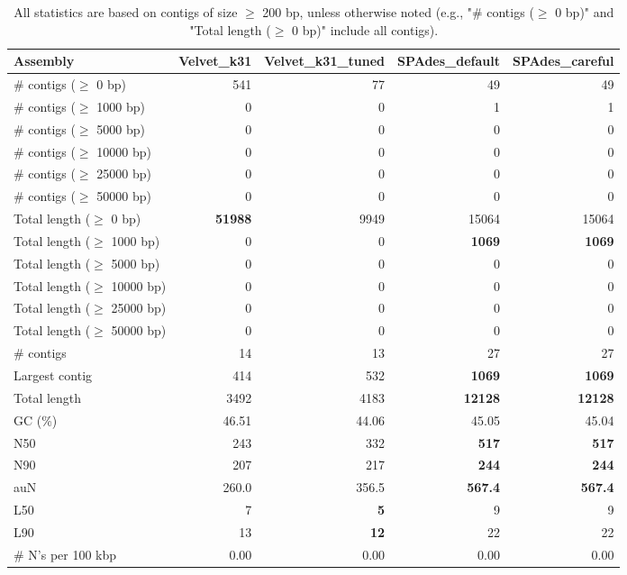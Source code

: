 \documentclass[12pt,a4paper]{article}
\begin{document}
\begin{table}[ht]
\begin{center}
\caption{All statistics are based on contigs of size $\geq$ 200 bp, unless otherwise noted (e.g., "\# contigs ($\geq$ 0 bp)" and "Total length ($\geq$ 0 bp)" include all contigs).}
\begin{tabular}{|l*{4}{|r}|}
\hline
Assembly & Velvet\_k31 & Velvet\_k31\_tuned & SPAdes\_default & SPAdes\_careful \\ \hline
\# contigs ($\geq$ 0 bp) & 541 & 77 & 49 & 49 \\ \hline
\# contigs ($\geq$ 1000 bp) & 0 & 0 & 1 & 1 \\ \hline
\# contigs ($\geq$ 5000 bp) & 0 & 0 & 0 & 0 \\ \hline
\# contigs ($\geq$ 10000 bp) & 0 & 0 & 0 & 0 \\ \hline
\# contigs ($\geq$ 25000 bp) & 0 & 0 & 0 & 0 \\ \hline
\# contigs ($\geq$ 50000 bp) & 0 & 0 & 0 & 0 \\ \hline
Total length ($\geq$ 0 bp) & {\bf 51988} & 9949 & 15064 & 15064 \\ \hline
Total length ($\geq$ 1000 bp) & 0 & 0 & {\bf 1069} & {\bf 1069} \\ \hline
Total length ($\geq$ 5000 bp) & 0 & 0 & 0 & 0 \\ \hline
Total length ($\geq$ 10000 bp) & 0 & 0 & 0 & 0 \\ \hline
Total length ($\geq$ 25000 bp) & 0 & 0 & 0 & 0 \\ \hline
Total length ($\geq$ 50000 bp) & 0 & 0 & 0 & 0 \\ \hline
\# contigs & 14 & 13 & 27 & 27 \\ \hline
Largest contig & 414 & 532 & {\bf 1069} & {\bf 1069} \\ \hline
Total length & 3492 & 4183 & {\bf 12128} & {\bf 12128} \\ \hline
GC (\%) & 46.51 & 44.06 & 45.05 & 45.04 \\ \hline
N50 & 243 & 332 & {\bf 517} & {\bf 517} \\ \hline
N90 & 207 & 217 & {\bf 244} & {\bf 244} \\ \hline
auN & 260.0 & 356.5 & {\bf 567.4} & {\bf 567.4} \\ \hline
L50 & 7 & {\bf 5} & 9 & 9 \\ \hline
L90 & 13 & {\bf 12} & 22 & 22 \\ \hline
\# N's per 100 kbp & 0.00 & 0.00 & 0.00 & 0.00 \\ \hline
\end{tabular}
\end{center}
\end{table}
\end{document}
